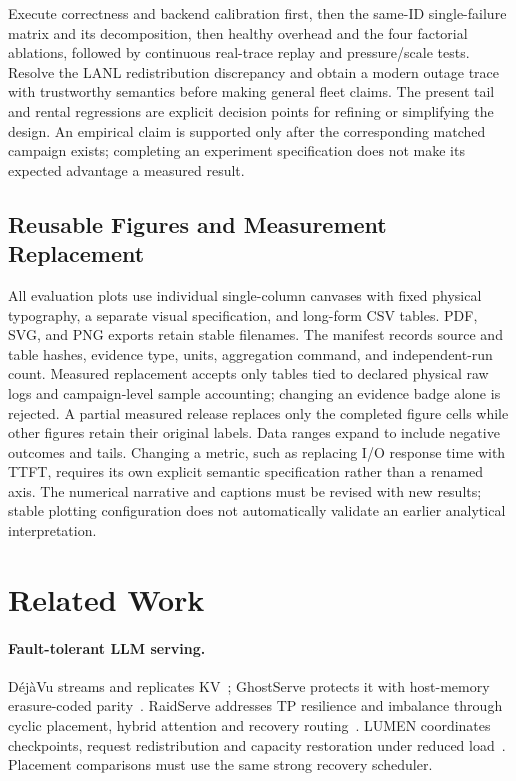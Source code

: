\documentclass[sigplan,10pt,anonymous,nonacm]{acmart}
\begin{document}
Execute correctness and backend calibration first, then the same-ID
single-failure matrix and its decomposition, then healthy overhead and
the four factorial ablations, followed by continuous real-trace replay
and pressure/scale tests. Resolve the LANL redistribution discrepancy
and obtain a modern outage trace with trustworthy semantics before
making general fleet claims. The present tail and rental regressions
are explicit decision points for refining or simplifying the design.
An empirical claim is supported only after the corresponding matched
campaign exists; completing an experiment specification does not make
its expected advantage a measured result.

\FloatBarrier
\subsection{Reusable Figures and Measurement Replacement}

All evaluation plots use individual single-column canvases with fixed
physical typography, a separate visual specification, and long-form CSV
tables. PDF, SVG, and PNG exports retain stable filenames. The manifest
records source and table hashes, evidence type, units, aggregation command,
and independent-run count. Measured replacement accepts only tables tied
to declared physical raw logs and campaign-level sample accounting;
changing an evidence badge alone is rejected. A partial measured release
replaces only the completed figure cells while other figures retain their
original labels. Data ranges expand to include negative outcomes and
tails. Changing a metric, such as replacing I/O response time with TTFT,
requires its own explicit semantic specification rather than a renamed
axis. The numerical narrative and captions must be revised with new
results; stable plotting configuration does not automatically validate
an earlier analytical interpretation.

\FloatBarrier

\section{Related Work}
\label{sec:related}

\paragraph{Fault-tolerant LLM serving.}
D\'ej\`aVu streams and replicates KV~\cite{strati2024dejavu}; GhostServe
protects it with host-memory erasure-coded parity~\cite{jayakody2026ghostserve}.
RaidServe addresses TP resilience and imbalance through cyclic placement,
hybrid attention and recovery routing~\cite{xu2026raidserve}. LUMEN
coordinates checkpoints, request redistribution and capacity restoration
under reduced load~\cite{cao2026lumen}. Placement comparisons must use the same strong recovery scheduler.
\end{document}
